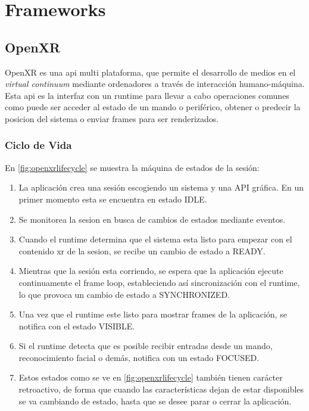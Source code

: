 \section{Frameworks}
\subsection{OpenXR}
OpenXR es una \acrfull{api} multi plataforma, que permite el desarrollo de medios en el \textit{virtual continuum} mediante ordenadores a través de interacción  humano-máquina.
Esta \acrshort{api} es la interfaz con un runtime para llevar a cabo operaciones comunes como puede ser acceder al estado de un mando o periférico, obtener o predecir la posicion del sistema o enviar frames para ser renderizados.
\paragraph{}

\subsubsection{Ciclo de Vida}
En \ref{fig:openxrlifecycle} se muestra la máquina de estados de la sesión:
\begin{enumerate}
    \item La aplicación crea una sesión escogiendo un sistema y una API gráfica. En un primer momento esta se encuentra en estado IDLE.
    \item Se monitorea la sesion en busca de cambios de estados mediante eventos.
    \item Cuando el runtime determina que el sistema esta listo para empezar con el contenido \acrshort{xr} de la sesion, se recibe un cambio de estado a READY.
    \item Mientras que la sesión esta corriendo, se espera que la aplicación ejecute continuamente el frame loop, estableciendo así sincronización con el runtime, lo que provoca un cambio de estado a SYNCHRONIZED.
    \item Una vez que el runtime este listo para mostrar frames de la aplicación, se notifica con el estado VISIBLE.
    \item Si el runtime detecta que es posible recibir entradas desde un mando, reconocimiento facial o demás, notifica con un estado FOCUSED.
    \item Estos estados como se ve en \ref{fig:openxrlifecycle} también tienen carácter retroactivo, de forma que cuando las características dejan de estar disponibles se va cambiando de estado, hasta que se desee parar o cerrar la aplicación.
    
\end{enumerate}


